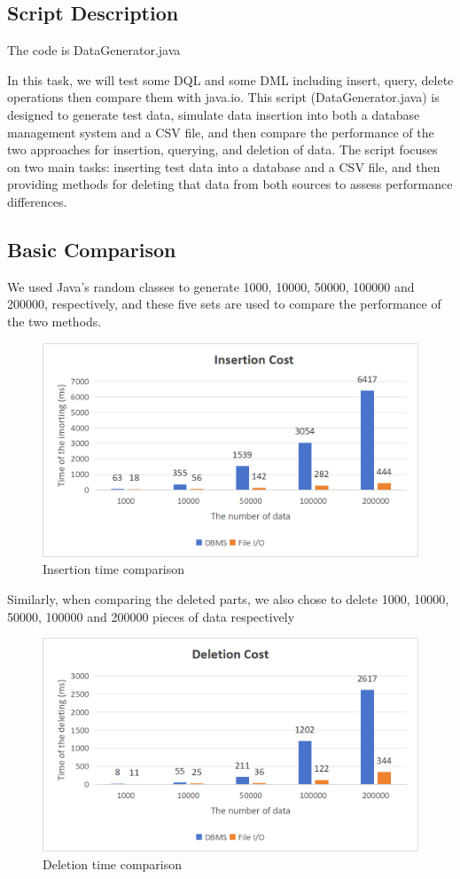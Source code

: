 \documentclass{article}
\begin{document}
\subsection{Script Description}
The code is DataGenerator.java

In this task, we will test some DQL and some DML including insert, query, delete operations then compare them with java.io. This script (DataGenerator.java) is designed to generate test data, simulate data insertion into both a database management system and a CSV file, and then compare the performance of the two approaches for insertion, querying, and deletion of data. The script focuses on two main tasks: inserting test data into a database and a CSV file, and then providing methods for deleting that data from both sources to assess performance differences.
\newpage
\subsection{Basic Comparison}

We used Java’s random classes to generate 1000, 10000, 50000, 100000 and 200000, respectively, and these five sets
are used to compare the performance of the two methods.
\begin{figure}[h]
\centering %
\includegraphics[width=.8\textwidth]{insert.png} %
\caption{Insertion time comparison} %
\label{fig:引用标签} %
\end{figure}

Similarly, when comparing the deleted parts, we also chose to delete 1000, 10000, 50000, 100000 and 200000 pieces of data respectively
\begin{figure}[h]
\centering %
\includegraphics[width=.8\textwidth]{delete.png} %
\caption{Deletion time comparison} %
\label{fig:引用标签} %
\end{figure}
\end{document}
